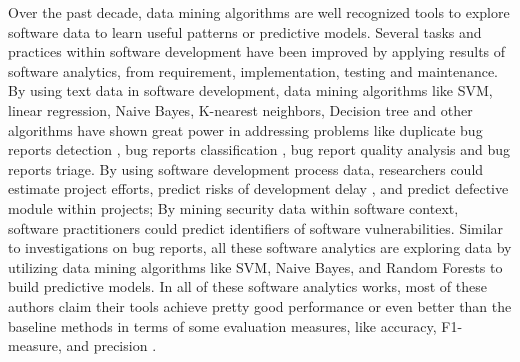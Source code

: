  Over the past decade, data mining algorithms are well
 recognized tools to explore software data to learn useful patterns or predictive
 models. Several tasks and practices within software development have been
 improved by applying results of software analytics, from requirement, implementation, testing and maintenance.
By using text data in software development, data mining algorithms like SVM, 
linear regression, Naive Bayes, K-nearest neighbors, Decision tree and other
algorithms have shown great power in addressing problems like
duplicate bug reports detection \cite{sun2010discriminative,jalbert2008automated,alipour2013contextual,nguyen2012duplicate},
bug reports classification \cite{antoniol2008bug,zanetti2013categorizing,lamkanfi2011comparing,tian2013drone}, 
bug report quality analysis \cite{bettenburg2008makes} and bug reports
triage\cite{anvik2006should, bhattacharya2010fine, lin2009empirical}. 
By using software development process data,
researchers could estimate project efforts\cite{dejaeger2012data,kocaguneli2012value, menzies2013local},
predict risks of development delay \cite{da2014empirical,choetkiertikul2015predicting}, 
and predict defective module within projects\cite{me07b,hall11,lessmann2008benchmarking};
By mining security data within software context, software practitioners could predict identifiers of software vulnerabilities\cite{shin2011evaluating,scandariato2012predicting,medeiros2014automatic}.
Similar to investigations on bug reports, all these software analytics 
are exploring data by utilizing data mining algorithms like SVM, Naive Bayes, and
Random Forests\cite{lessmann2008benchmarking, me07b, choetkiertikul2015predicting} to build 
predictive models. In all of these software analytics works,  most of these authors claim
their tools achieve pretty good performance or even better than the baseline methods in terms
of some evaluation measures, like accuracy, F1-measure, and precision \cite{lamkanfi2011comparing, alipour2013contextual,lin2009empirical,lessmann2008benchmarking,hall11}.

